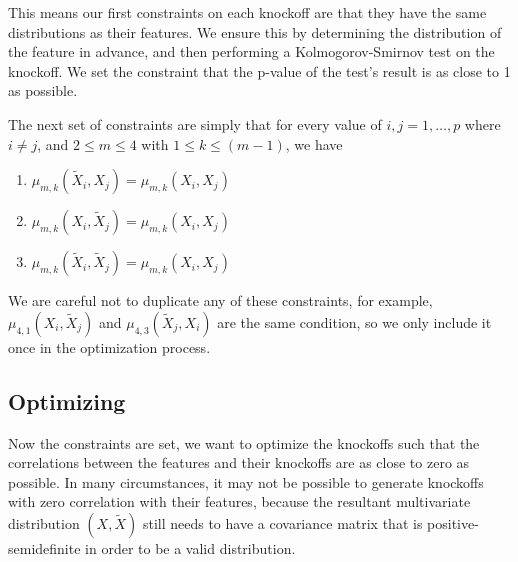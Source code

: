 \documentclass[review]{elsarticle}
\begin{document}
This means our first constraints on each knockoff are that they have the same distributions as their features. We ensure this by determining the distribution of the feature in advance, and then performing a Kolmogorov-Smirnov test on the knockoff. We set the constraint that the p-value of the test's result is as close to 1 as possible.



The next set of constraints are simply that for every value of $i,j=1,\dots,p$ where $i\ne j$, and $2\le m\le 4$ with $1\le k\le (m-1)$, we have

\begin{enumerate}
	\item $\mu_{m,k}(\tilde{X}_i,X_j)=\mu_{m,k}(X_i,X_j)$
	\item $\mu_{m,k}(X_i,\tilde{X}_j)=\mu_{m,k}(X_i,X_j)$
	\item $\mu_{m,k}(\tilde{X}_i,\tilde{X}_j)=\mu_{m,k}(X_i,X_j)$
\end{enumerate}

We are careful not to duplicate any of these constraints, for example, $\mu_{4,1}\left(X_i,\tilde{X}_j\right)$ and $\mu_{4,3}\left(\tilde{X}_j,X_i\right)$ are the same condition, so we only include it once in the optimization process.

\subsection{Optimizing}

Now the constraints are set, we want to optimize the knockoffs such that the correlations between the features and their knockoffs are as close to zero as possible. In many circumstances, it may not be possible to generate knockoffs with zero correlation with their features, because the resultant multivariate distribution $(X,\tilde{X})$ still needs to have a covariance matrix that is positive-semidefinite in order to be a valid distribution.
\end{document}
